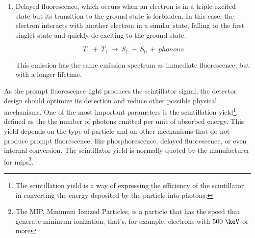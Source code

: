 \begin{enumerate}
\item{} Delayed fluorescence, which occurs when an electron is in a triple excited state but its transition to the ground state is forbidden. In this case, the electron interacts with another electron in a similar state, falling to the first singlet state and quickly de-exciting to the ground state. 

\begin{equation}
T_{1} ~+~ T_{1}~ \longrightarrow ~ S_{1} ~+~ S_{0} ~+~ phonons
\label{eq:DelayFluorescence}
\end{equation}

This emission has the same emission spectrum as immediate fluorescence, but with a longer lifetime.
\end{enumerate}
As the prompt fluorescence light produces the scintillator signal, the detector design should optimize its detection and reduce other possible physical mechanisms. One of the most important parameters is the scintillation yield\footnote{The scintillation yield is a way of expressing the efficiency of the scintillator in converting the energy deposited by the particle into photons.}, defined as the the number of photons emitted per unit of absorbed energy. This yield depends on the type of particle and on other mechanisms that do not produce prompt fluorescence, like phosphorescence, delayed fluorescence, or even internal conversion. The scintillator yield is normally quoted by the manufacturer for mips\footnote{The MIP, Minimum Ionized Particles, is a particle that has the speed that generate minimum ionization, that's, for example, electrons with $500~\keV$ or more}.
